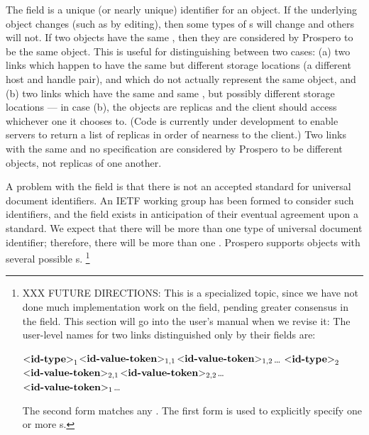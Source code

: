 The  field is a unique (or nearly unique)
identifier for an object.  If the underlying object changes (such as
by editing), then some types of s will change and
others will not.  If two
objects have the same , then they are considered by Prospero
to be the same object.  This is useful for distinguishing between two
cases: (a) two 
links which happen to have the same  but
different storage locations (a different host and handle pair), and which
do not actually represent the same object, and (b) two links which have the
same  and same , but possibly different storage
locations --- in case (b), the  objects are replicas and the client
should access whichever one it 
chooses to.  (Code is currently under development to enable
servers to return a list of replicas in order of nearness to
the client.)  Two links with the same  and no
 specification are considered by Prospero to be different
objects, not replicas of one another.

A problem with the  field is that there is not an accepted
standard for universal document identifiers.  An IETF working group has
been formed to consider such identifiers, and the 
field exists in anticipation of their eventual agreement upon a standard.
We expect that there will be more than one type of universal document
identifier; therefore, there will be more than one .
Prospero supports objects with several possible s.%
\footnote{XXX FUTURE DIRECTIONS: This is a specialized topic, since we
have not done much implementation work on the  field, pending
greater consensus in the field.  This section will go
into the user's manual when we revise it:  The 
  user-level names for two links distinguished only by their 
  fields are: 
  \begin{command}
	\ors{}\lit{\#}\lit{\#}\(\mbox{\meta{id-type}}_1\)\lit{\#}\(\mbox{\meta{id-value-token}}_{1,1}\)\lit{\#}\(\mbox{\meta{id-value-token}}_{1,2}\)\ldots %
	\lit{\#}\lit{\#}\(\mbox{\meta{id-type}}_2\)\lit{\#}\(\mbox{\meta{id-value-token}}_{2,1}\)\lit{\#}\(\mbox{\meta{id-value-token}}_{2,2}\)\ldots \\
  \metaor {}\lit{\#}\(\mbox{\meta{id-value-token}}_1\)\lit{\#}\ldots \ore
  \end{command}

The second form matches any .  The first form is used to
explicitly specify one or more s.

}

